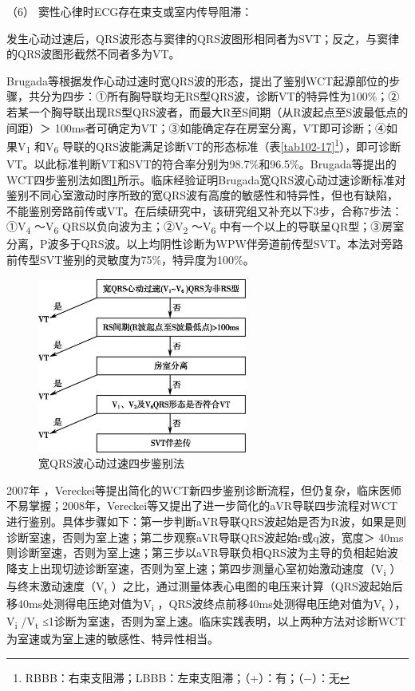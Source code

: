 \hypertarget{text00295.htmlux5cux23CHP10-2-8-2-2-4-6}{}
（6） 窦性心律时ECG存在束支或室内传导阻滞：

发生心动过速后，QRS波形态与窦律的QRS波图形相同者为SVT；反之，与窦律的QRS波图形截然不同者多为VT。

Brugada等根据发作心动过速时宽QRS波的形态，提出了鉴别WCT起源部位的步骤，共分为四步：①所有胸导联均无RS型QRS波，诊断VT的特异性为100\%；②若某一个胸导联出现RS型QRS波者，而最大R至S间期（从R波起点至S波最低点的间距）＞
100ms者可确定为VT；③如能确定存在房室分离，VT即可诊断；④如果V\textsubscript{1}
和V\textsubscript{6}
导联的QRS波能满足诊断VT的形态标准（表\ref{tab102-17}\footnote{RBBB：右束支阻滞；LBBB：左束支阻滞；（+）：有；（−）：无}），即可诊断VT。以此标准判断VT和SVT的符合率分别为98.7\%和96.5\%。Brugada等提出的WCT四步鉴别法如图\ref{fig102-16}所示。临床经验证明Brugada宽QRS波心动过速诊断标准对鉴别不同心室激动时序所致的宽QRS波有高度的敏感性和特异性，但也有缺陷，不能鉴别旁路前传或VT。在后续研究中，该研究组又补充以下3步，合称7步法：①V\textsubscript{4}
～V\textsubscript{6} QRS以负向波为主；②V\textsubscript{2}
～V\textsubscript{6}
中有一个以上的导联呈QR型；③房室分离，P波多于QRS波。以上均阴性诊断为WPW伴旁道前传型SVT。本法对旁路前传型SVT鉴别的灵敏度为75\%，特异度为100\%。

\begin{figure}[!htbp]
 \centering
 \includegraphics[width=2.70833in,height=2.26042in]{./images/Image00454.jpg}
 \captionsetup{justification=centering}
 \caption{宽QRS波心动过速四步鉴别法}
 \label{fig102-16}
  \end{figure} 

2007年
，Vereckei等提出简化的WCT新四步鉴别诊断流程，但仍复杂，临床医师不易掌握；2008年，Vereckei等又提出了进一步简化的aVR导联四步流程对WCT进行鉴别。具体步骤如下：第一步判断aVR导联QRS波起始是否为R波，如果是则诊断室速，否则为室上速；第二步观察aVR导联QRS波起始r或q波，宽度＞
40ms则诊断室速，否则为室上速；第三步以aVR导联负相QRS波为主导的负相起始波降支上出现切迹诊断室速，否则为室上速；第四步测量心室初始激动速度（V\textsubscript{i}
）与终末激动速度（V\textsubscript{t}
）之比，通过测量体表心电图的电压来计算（QRS波起始后移40ms处测得电压绝对值为V\textsubscript{i}
，QRS波终点前移40ms处测得电压绝对值为V\textsubscript{t}
），V\textsubscript{i} /V\textsubscript{t}
≤1诊断为室速，否则为室上速。临床实践表明，以上两种方法对诊断WCT为室速或为室上速的敏感性、特异性相当。


